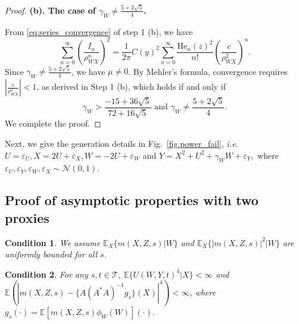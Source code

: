 \documentclass[
  12pt]{article}
\newtheorem{assumption}{Condition}
\def\cN{\mathcal{N}}
\def\cT{\mathcal{T}}
\begin{document}
\begin{proof}
\noindent\textbf{(b). The case of $\gamma_W \neq \frac{5 + 2\sqrt{5}}{4}$.}

From \eqref{eq:series_convergence} of step 1 (b), we have
$$
\sum_{n=0}^\infty \left( \frac{I_n}{\rho_{WX}^n} \right)^2 = \frac{1}{2\pi} C(y)^2 \sum_{n=0}^{\infty} \frac{\mathrm{He}_n(z)^2}{n!}\left(\frac{c}{\rho_{WX}^2}\right)^n.
$$
Since $\gamma_W \neq \frac{5 + 2\sqrt{5}}{4}$, we have $\mu \neq 0$. By Mehler's formula, convergence requires $\left| \frac{c}{\rho_{WX}^2} \right| < 1$, as derived in Step 1 (b), which holds if and only if
$$
\gamma_W>\frac{-15+36\sqrt{5}}{72+16\sqrt{5}} \text{ and } \gamma_W \ne  \frac{5 + 2\sqrt{5}}{4}.
$$
We complete the proof. 
\end{proof}

Next, we give the generation details in Fig.~\ref{fig.power_fail}, \emph{i.e.} $U=\varepsilon_U,X =2U + \varepsilon_X,W =-2U +\varepsilon_W$ and $Y= X^2 + U^2+\gamma_W W+\varepsilon_Y,$
where $\varepsilon_U,\varepsilon_Y,\varepsilon_W,\varepsilon_X \sim \cN(0,1)$.  




\subsection{Proof of asymptotic properties with two proxies}
\label{appx.two_asymptotic}

\begin{assumption}\label{differentiabilty and integrability_two}
We assume $\mathbb{E}_X\{m(X,Z,s)|W\}$ and $\mathbb{E}_X\{|m(X,Z,s)| ^2|W\}$ are uniformly bounded for all $s$. 
\end{assumption}

\begin{assumption}\label{assum.var_two}
    For any $s,t \in \cT$, $\mathbb{E}\{U(W,Y,t)^4|X\}<\infty$ and $\mathbb{E}(|m(X,Z,s) -\{A(A^*A)^{-1}g_{s}\}(X)|^4)<\infty$, where $g_{s}(\cdot)=\mathbb{E} [ m(X,Z,s) \phi_W(W)](\cdot)$.
\end{assumption}
\end{document}
